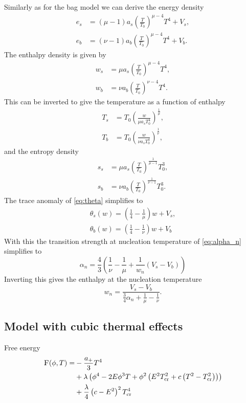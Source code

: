 Similarly as for the bag model we can derive the energy density
\begin{align}
e_s &= (\mu - 1) a_s \left( \frac{T}{T_0} \right)^{\mu-4} T^4 + V_s, \\
e_b &= (\nu - 1) a_b \left( \frac{T}{T_0} \right)^{\mu-4} T^4 + V_b.
\end{align}
The enthalpy density is given by
\begin{align}
w_s &= \mu a_s \left( \frac{T}{T_0} \right)^{\mu-4} T^4, \\
w_b &= \nu a_b \left( \frac{T}{T_0} \right)^{\nu-4} T^4.
\end{align}
This can be inverted to give the temperature as a function of enthalpy
\begin{align}
T_s &= T_0 \left( \frac{w}{\mu a_s T_0^4} \right)^\frac{1}{\mu}, \\
T_b &= T_0 \left( \frac{w}{\nu a_s T_0^4} \right)^\frac{1}{\nu},
\end{align}
and the entropy density
\begin{align}
s_s &= \mu a_s \left( \frac{T}{T_0} \right)^\frac{1}{\mu-1} T_0^3, \\
s_b &= \nu a_b \left( \frac{T}{T_0} \right)^\frac{1}{\nu-1} T_0^3.
\end{align}
The trace anomaly of \eqref{eq:theta} simplifies to
\begin{align}
\theta_s(w) = \left( \frac{1}{4} - \frac{1}{\mu} \right) w + V_s, \\
\theta_b(w) = \left( \frac{1}{4} - \frac{1}{\nu} \right) w + V_b
\end{align}
With this the transition strength at nucleation temperature of \eqref{eq:alpha_n} simplifies to
\begin{equation}
\alpha_n = \frac{4}{3} \left( \frac{1}{\nu} - \frac{1}{\mu} + \frac{1}{w_n} (V_s - V_b) \right)
\end{equation}
Inverting this gives the enthalpy at the nucleation temperature
\begin{equation}
w_n = \frac{V_s - V_b}{ \frac{3}{4} \alpha_n + \frac{1}{\mu} - \frac{1}{\nu} }.
\end{equation}


\subsection{Model with cubic thermal effects}
Free energy
\cite[eq. 45]{giese_2020}
\begin{align}
\begin{split}
\textsc{F}(\phi, T) =
&- \frac{a_+}{3} T^4 \\
&+ \lambda \left( \phi^4 - 2E\phi^3 T + \phi^2 \left( E^2 T_\text{cr}^2 + c \left( T^2 - T_\text{cr}^2 \right) \right) \right) \\
&+ \frac{\lambda}{4} \left( c - E^2 \right)^2 T_\text{cr}^4
\end{split}
\end{align}

